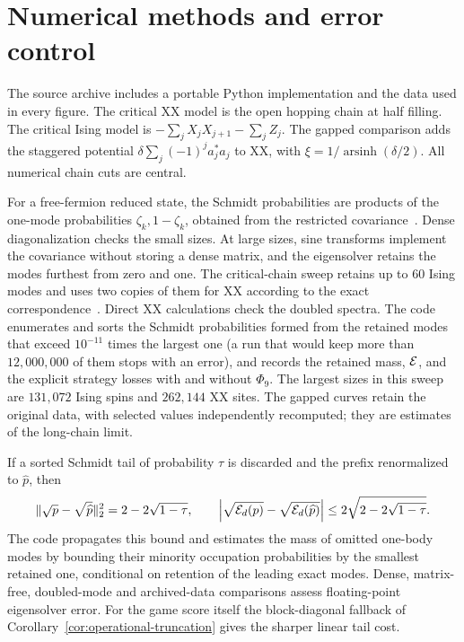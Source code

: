 \section{Numerical methods and error control}\label{app:numerics}

The source archive includes a portable Python implementation and the data
used in every figure. The critical XX model is the open hopping chain at
half filling. The critical Ising model is
$-\sum_j X_jX_{j+1}-\sum_jZ_j$. The gapped comparison adds the staggered
potential $\delta\sum_j(-1)^j a_j^*a_j$ to XX, with
$\xi=1/\operatorname{arsinh}(\delta/2)$. All numerical chain cuts are
central.

For a free-fermion reduced state, the Schmidt probabilities are products
of the one-mode probabilities $\zeta_k,1-\zeta_k$, obtained from the
restricted covariance~\cite{Peschel03}. Dense diagonalization checks the
small sizes. At large sizes, sine transforms implement the covariance
without storing a dense matrix, and the eigensolver retains the modes
furthest from zero and one. The critical-chain sweep retains up to 60
Ising modes and uses two copies of them for XX according to the exact
correspondence~\cite{IgloiJuhasz08}. Direct XX calculations check the
doubled spectra. The code enumerates and sorts the Schmidt probabilities
formed from the retained modes that exceed $10^{-11}$ times the
largest one (a run that would keep more than $12{,}000{,}000$ of them
stops with an error), and records the retained mass, $\mathcal{E}$, and the explicit strategy
losses with and without $\Phi_9$. The largest sizes in this sweep are
$131{,}072$ Ising spins and $262{,}144$ XX sites.
The gapped curves retain the original
data, with selected values independently recomputed; they are estimates
of the long-chain limit.

If a sorted Schmidt tail of probability $\tau$ is discarded and the
prefix renormalized to $\widehat p$, then
\begin{equation}\label{eq:tail-control}
\|\sqrt p-\sqrt{\widehat p}\|_2^2=2-2\sqrt{1-\tau},\qquad
\left|\sqrt{\mathcal{E}_d(p)}-\sqrt{\mathcal{E}_d(\widehat p)}\right|
\le2\sqrt{2-2\sqrt{1-\tau}}.
\end{equation}
The code propagates this bound and estimates the mass of omitted
one-body modes by bounding their minority occupation probabilities
by the smallest retained one, conditional on retention of the
leading exact modes. Dense, matrix-free, doubled-mode and
archived-data comparisons assess floating-point eigensolver error.
For the game score itself the
block-diagonal fallback of Corollary~\ref{cor:operational-truncation}
gives the sharper linear tail cost.

